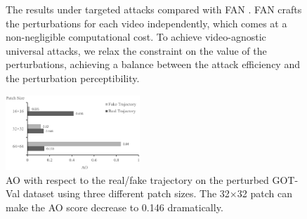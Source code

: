 \documentclass[journal]{IEEEtran}
\renewcommand{\uline}{}
\begin{document}
\begin{figure}[t]
  \centering
  \vspace{-1mm}
  \caption{The results under targeted attacks compared with FAN \cite{FAN}.  FAN crafts the perturbations for each video independently, which comes at a non-negligible computational cost. To achieve video-agnostic universal attacks, we relax the constraint on the value of the perturbations, achieving a balance between the attack efficiency and the perturbation perceptibility.}
  \label{fig:vis_fan}
  \vspace{-4mm}
\end{figure}
\begin{figure}[t!]
  \begin{center}
    \includegraphics[width=0.45\textwidth]{images_imperceptible/patch_size/patch_size.png}
  \end{center}
  \caption{AO with respect to the real/fake trajectory on the perturbed GOT-Val dataset using three different patch sizes. The \uline{32$\times$32} patch can make the AO score decrease to 0.146 dramatically.}
  \label{fig:patch_size_table}
  \vspace{-4mm}
\end{figure}
\end{document}

